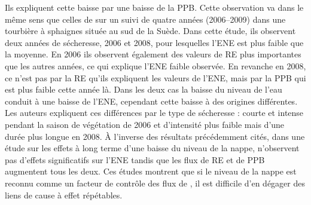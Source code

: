 Ils expliquent cette baisse par une baisse de la PPB.
Cette observation va dans le même sens que celles de \citet{lund2012} sur un suivi de quatre années (2006--2009) dans une tourbière à sphaignes située au sud de la Suède. 
Dans cette étude, ils observent deux années de sécheresse, 2006 et 2008, pour lesquelles l'ENE est plus faible que la moyenne.
En 2006 ils observent également des valeurs de RE plus importantes que les autres années, ce qui explique l'ENE faible observée.
En revanche en 2008, ce n'est pas par la RE qu'ils expliquent les valeurs de l'ENE, mais par la PPB qui est plus faible cette année là.
Dans les deux cas la baisse du niveau de l'eau conduit à une baisse de l'ENE, cependant cette baisse à des origines différentes.
Les auteurs expliquent ces différences par le type de sécheresse : courte et intense pendant la saison de végétation de 2006 et d'intensité plus faible mais d'une durée plus longue en 2008.
À l'inverse des résultats précédemment cités, \citet{ballantyne2014} dans une étude sur les effets à long terme d'une baisse du niveau de la nappe, n'observent pas d'effets significatifs sur l'ENE tandis que les flux de RE et de PPB augmentent tous les deux.
Ces études montrent que si le niveau de la nappe est reconnu comme un facteur de contrôle des flux de \coo, il est difficile d'en dégager des liens de cause à effet répétables.

